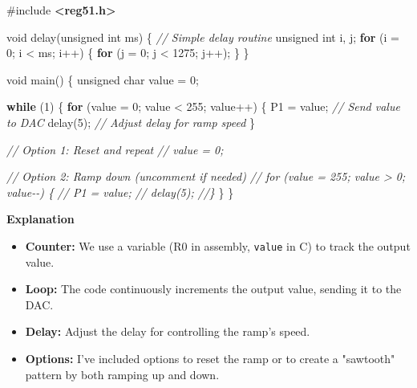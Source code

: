 \documentclass[
]{article}
\newenvironment{Shaded}{}{}
\newcommand{\CommentTok}[1]{\textcolor[rgb]{0.38,0.63,0.69}{\textit{#1}}}
\newcommand{\ControlFlowTok}[1]{\textcolor[rgb]{0.00,0.44,0.13}{\textbf{#1}}}
\newcommand{\DataTypeTok}[1]{\textcolor[rgb]{0.56,0.13,0.00}{#1}}
\newcommand{\DecValTok}[1]{\textcolor[rgb]{0.25,0.63,0.44}{#1}}
\newcommand{\ImportTok}[1]{\textcolor[rgb]{0.00,0.50,0.00}{\textbf{#1}}}
\newcommand{\NormalTok}[1]{#1}
\newcommand{\OperatorTok}[1]{\textcolor[rgb]{0.40,0.40,0.40}{#1}}
\newcommand{\PreprocessorTok}[1]{\textcolor[rgb]{0.74,0.48,0.00}{#1}}
\begin{document}
\begin{Shaded}
\begin{Highlighting}[]
\PreprocessorTok{\#include }\ImportTok{\textless{}reg51.h\textgreater{}}

\DataTypeTok{void}\NormalTok{ delay}\OperatorTok{(}\DataTypeTok{unsigned} \DataTypeTok{int}\NormalTok{ ms}\OperatorTok{)} \OperatorTok{\{} \CommentTok{// Simple delay routine}
    \DataTypeTok{unsigned} \DataTypeTok{int}\NormalTok{ i}\OperatorTok{,}\NormalTok{ j}\OperatorTok{;}
    \ControlFlowTok{for} \OperatorTok{(}\NormalTok{i }\OperatorTok{=} \DecValTok{0}\OperatorTok{;}\NormalTok{ i }\OperatorTok{\textless{}}\NormalTok{ ms}\OperatorTok{;}\NormalTok{ i}\OperatorTok{++)} \OperatorTok{\{}
        \ControlFlowTok{for} \OperatorTok{(}\NormalTok{j }\OperatorTok{=} \DecValTok{0}\OperatorTok{;}\NormalTok{ j }\OperatorTok{\textless{}} \DecValTok{1275}\OperatorTok{;}\NormalTok{ j}\OperatorTok{++);}
    \OperatorTok{\}}
\OperatorTok{\}}

\DataTypeTok{void}\NormalTok{ main}\OperatorTok{()} \OperatorTok{\{}
    \DataTypeTok{unsigned} \DataTypeTok{char}\NormalTok{ value }\OperatorTok{=} \DecValTok{0}\OperatorTok{;}

    \ControlFlowTok{while} \OperatorTok{(}\DecValTok{1}\OperatorTok{)} \OperatorTok{\{}
        \ControlFlowTok{for} \OperatorTok{(}\NormalTok{value }\OperatorTok{=} \DecValTok{0}\OperatorTok{;}\NormalTok{ value }\OperatorTok{\textless{}} \DecValTok{255}\OperatorTok{;}\NormalTok{ value}\OperatorTok{++)} \OperatorTok{\{}
\NormalTok{            P1 }\OperatorTok{=}\NormalTok{ value}\OperatorTok{;}   \CommentTok{// Send value to DAC}
\NormalTok{            delay}\OperatorTok{(}\DecValTok{5}\OperatorTok{);}     \CommentTok{// Adjust delay for ramp speed}
        \OperatorTok{\}}

        \CommentTok{// Option 1: Reset and repeat}
        \CommentTok{// value = 0;}

        \CommentTok{// Option 2: Ramp down (uncomment if needed)}
        \CommentTok{// for (value = 255; value \textgreater{} 0; value{-}{-}) \{}
        \CommentTok{//    P1 = value;}
        \CommentTok{//    delay(5);}
        \CommentTok{//\}}
    \OperatorTok{\}}
\OperatorTok{\}}
\end{Highlighting}
\end{Shaded}

\textbf{Explanation}

\begin{itemize}
\item
  \textbf{Counter:} We use a variable (R0 in assembly, \texttt{value} in
  C) to track the output value.
\item
  \textbf{Loop:} The code continuously increments the output value,
  sending it to the DAC.
\item
  \textbf{Delay:} Adjust the delay for controlling the ramp's speed.
\item
  \textbf{Options:} I've included options to reset the ramp or to create
  a "sawtooth" pattern by both ramping up and down.
\end{itemize}
\end{document}
